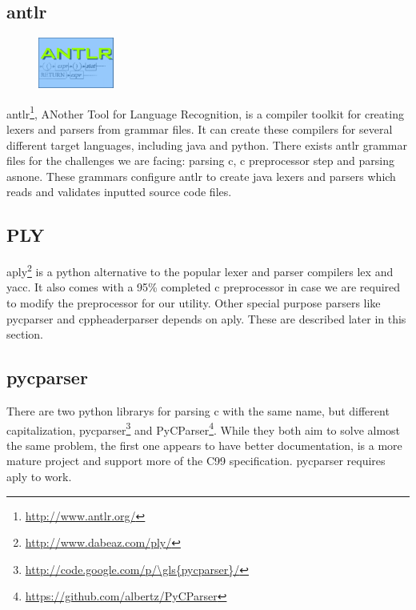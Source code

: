 \subsection{\gls{antlr}}
\label{sec:pre:antlr}
\begin{figure}
	\vspace{-20pt}
	\includegraphics[width=2.5cm]{./planning/img/antlr_logo}
	\vspace{-20pt}
\end{figure}
\gls{antlr}\footnote{\url{http://www.antlr.org/}}, ANother Tool for Language
Recognition, is a compiler toolkit for creating \glspl{lexer} and \glspl{parser} from grammar
files. It can create these compilers for several different target languages,
including \Gls{java} and \Gls{python}. There exists \gls{antlr} grammar files for the challenges
we are facing: parsing \Gls{c}, \Gls{c} \gls{preprocessor} step and parsing \gls{asnone}. These grammars
configure \gls{antlr} to create \Gls{java} \glspl{lexer} and \glspl{parser} which reads and validates
inputted source code files.

\subsection{PLY}
\Gls{aply}\footnote{\url{http://www.dabeaz.com/ply/}} is a \Gls{python} alternative to the
popular \gls{lexer} and \gls{parser} compilers lex and yacc. It also comes with a 95\%
completed \Gls{c} \gls{preprocessor} in case we are required to modify the \gls{preprocessor}
for our \gls{utility}. Other special purpose \glspl{parser} like \gls{pycparser} and
cppheaderparser depends on \Gls{aply}. These are described later in this section.

\subsection{\gls{pycparser}}
\label{sec:pre:pycparser}
There are two \Gls{python} \glspl{library} for parsing \Gls{c} with the same name, but different
capitalization, \gls{pycparser}\footnote{\url{http://code.google.com/p/\gls{pycparser}/}}
and PyCParser\footnote{\url{https://github.com/albertz/PyCParser}}. While they
both aim to solve almost the same problem, the first one appears to have better
documentation, is a more mature project and support more of the \Gls{C99}
specification. \gls{pycparser} requires \Gls{aply} to work.

